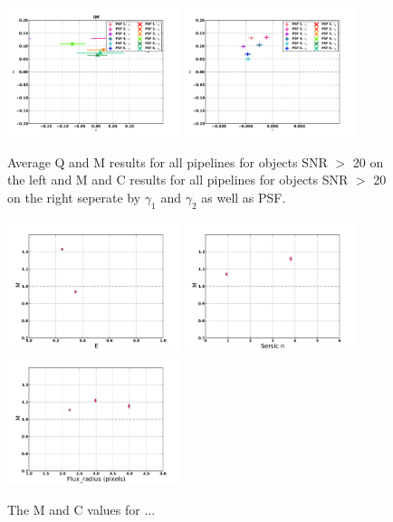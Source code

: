 \begin{figure}
\centering
\includegraphics[width=0.45\textwidth]{fig/QMC_main_IM_f.pdf} 
\includegraphics[width=0.45\textwidth]{fig/MC_main_IM_f.pdf} 
\caption{Average Q and M results for all pipelines for objects 
SNR $>$ 20 on the left and M and C results for all pipelines for objects 
SNR $>$ 20 on the right seperate by $\gamma_{1} $ and $\gamma_{2} $ as
well as PSF.}
\label{fig:IMCAT_qmc}
\end{figure}

\begin{figure}
\centering
\includegraphics[width=0.45\textwidth]{fig/MvaleIM.pdf} 
\includegraphics[width=0.45\textwidth]{fig/Mval_typeIM.pdf} 
\includegraphics[width=0.45\textwidth]{fig/Mval_sizeIM.pdf} 
\caption{The M and C values for ...}
\label{fig:DEIMOS_m}
\end{figure}

